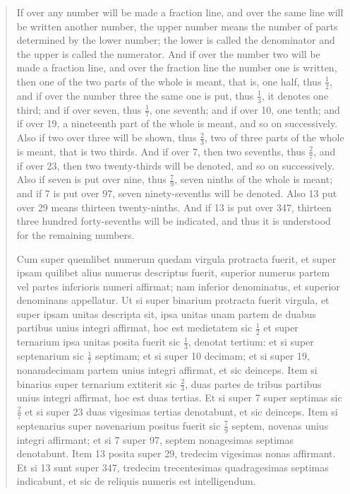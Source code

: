 \documentclass{article}
\theoremstyle{definition}
\begin{document}
\begin{quote}
If over any number will be made a fraction line, and over the same line
will be written another number, the upper number means the number of parts
determined by the lower number; the lower is called the denominator and the
upper is called the numerator. And if over the number two will be made a 
fraction line, and over the fraction line the number one is written, then one of
the two parts of the whole is meant, that is, one half, thus $\frac{1}{2}$, and if over the number
three the same one is put, thus $\frac{1}{3}$, it denotes one third; and if over seven, thus
$\frac{1}{7}$, one seventh; and if over 10, one tenth; and if over 19, a nineteenth part of
the whole is meant, and so on successively. Also if two over three will be shown,
thus $\frac{2}{3}$, two of three parts of the whole is meant, that is two thirds. And if
over 7, then two sevenths, thus $\frac{2}{7}$, and if over 23, then two twenty-thirds will
be denoted, and so on successively. Also if seven is put over nine, thus $\frac{7}{9}$, seven
ninths of the whole is meant; and if 7 is put over 97, seven ninety-sevenths will
be denoted. Also 13 put over 29 means thirteen twenty-ninths. And if 13 is put
over 347, thirteen three hundred forty-sevenths will be indicated, and thus it  is
understood for the remaining numbers.

Cum super quemlibet numerum quedam virgula protracta fuerit, et super ipsam
quilibet alius numerus descriptus fuerit, superior numerus partem vel partes inferioris
numeri affirmat; nam inferior denominatus, et superior denominans appellatur. Ut si super
binarium protracta fuerit virgula, et super ipsam unitas descripta sit, ipsa unitas unam
partem de duabus partibus unius integri affirmat, hoc est medietatem sic $\frac{1}{2}$ et super
ternarium ipsa unitas posita fuerit sic $\frac{1}{3}$, denotat tertium: et si super septenarium sic
$\frac{1}{7}$ septimam; et si super 10 decimam; et si super 19, nonamdecimam partem unius integri
affirmat, et sic deinceps. Item si binarius super ternarium extiterit sic $\frac{2}{3}$, duas partes
de tribus partibus unius integri affirmat, hoc est duas tertias. Et si super 7 super septimas
sic $\frac{2}{7}$ et si super 23 duas vigesimas tertias denotabunt, et sic deinceps. Item si
septenarius super novenarium positus fuerit sic $\frac{7}{9}$ septem, novenas unius integri affirmant;
et si 7 super 97, septem nonagesimas septimas denotabunt. Item 13 posita super 29, tredecim
vigesimas nonas affirmant. Et si 13 sunt super 347, tredecim trecentesimas quadragesimas
septimas indicabunt, et sic de reliquis numeris est intelligendum.
\end{quote}
\end{document}
